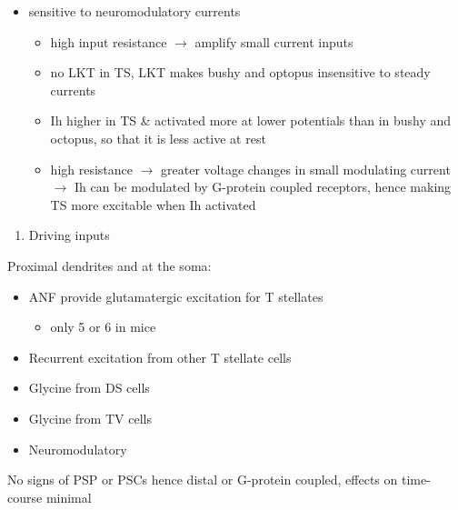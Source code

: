 

\begin{itemize}
\item sensitive to neuromodulatory currents \citep{FujinoOertel:2001}
\begin{itemize}
\item high input resistance $\rightarrow$ amplify small current inputs \citep{FujinoOertel:2001}
\item no LKT in TS,  LKT makes bushy and optopus insensitive to steady currents \citep{OertelFujino:2001,McGinleyOertel:2006}
\item Ih higher in TS \& activated more at lower potentials than in bushy and octopus, so that it is less active at rest
\item high resistance $\rightarrow$ greater voltage changes in small modulating current $\rightarrow$ Ih can be modulated by G-protein coupled receptors, hence making TS more excitable when Ih activated \citep{RodriguesOertel:2006}
\end{itemize}
\end{itemize}

\begin{enumerate}
\item Driving inputs
\end{enumerate}
Proximal dendrites and at the soma:

\begin{itemize}
\item ANF provide glutamatergic excitation for T stellates  \citep{Cant:1981,FerragamoGoldingEtAl:1998a,Alibardi:1998a}
\begin{itemize}
\item only 5 or 6 in mice \citep{FerragamoGoldingEtAl:1998a,CaoOertel:2010}
\end{itemize}
\item Recurrent excitation from other T stellate cells \citep{FerragamoGoldingEtAl:1998a}
\item Glycine from DS cells \citep{FerragamoGoldingEtAl:1998a}
\item Glycine from TV cells \citep{WickesbergOertel:1990,ZhangOertel:1993b}
\item Neuromodulatory
\end{itemize}
     No signs of PSP or PSCs hence distal or G-protein coupled, effects on time-course minimal
     

